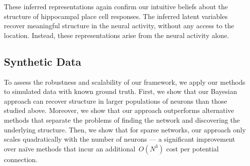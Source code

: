 These inferred representations again confirm our intuitive beliefs 
about the structure of hippocampal place cell responses. The 
inferred latent variables recover meaningful structure in the
neural activity, without any access to the location. Instead, 
these representations arise from the neural activity alone.

\subsection{Synthetic Data}
\label{sec:synthetic}

To assess the robustness and scalability of our framework, we apply
our methods to simulated data with known ground truth.  First, we show
that our Bayesian approach can recover structure in larger populations
of neurons than those studied above.  Moreover, we show that our
approach outperforms alternative methods that separate the problems of
finding the network and discovering the underlying structure. Then, we
show that for sparse networks, our approach only scales quadratically
with the number of neurons --- a significant improvement over na\"ive
methods that incur an additional~$O(N^3)$ cost per potential connection.


